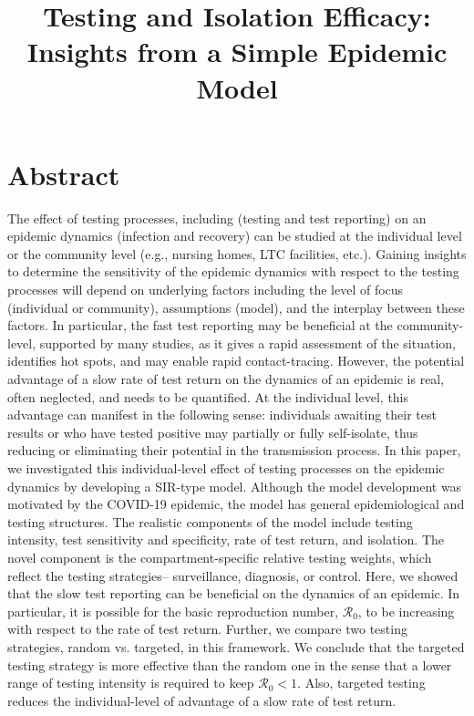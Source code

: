 \documentclass[12pt]{article}
\title{Testing and Isolation Efficacy: Insights from a Simple Epidemic Model}
\newcommand{\Rnum}{\mathcal{R}_0}
\newcommand{\covid}{COVID-19\xspace}
\theoremstyle{definition} %
\begin{document}
\maketitle

\linenumbers

\section{Abstract}

The effect of testing processes, including (testing and test reporting) on an epidemic dynamics (infection and recovery) can be studied at the individual level or the community level (e.g., nursing homes, LTC facilities, etc.). 
Gaining insights to determine the sensitivity of the epidemic dynamics with respect to the testing processes will depend on underlying factors including the level of focus (individual or community), assumptions (model), and the interplay between these factors. 
In particular, the fast test reporting may be beneficial at the community-level, supported by many studies, as it gives a rapid assessment of the situation, identifies hot spots, and may enable rapid contact-tracing. However, the potential advantage of a slow rate of test return on the dynamics of an epidemic is real, often neglected, and needs to be quantified. At the individual level, this advantage can manifest in the following sense: individuals awaiting their test results or who have tested positive may partially or fully self-isolate, thus reducing or eliminating their potential in the transmission process.
In this paper, we investigated this individual-level effect of testing processes on the epidemic dynamics by developing a SIR-type model.
Although the model development was motivated by the \covid epidemic, the model has general epidemiological and testing structures. The realistic components of the model include testing intensity, test sensitivity and specificity, rate of test return, and isolation. The novel component is the compartment-specific relative testing weights, which reflect the testing strategies-- surveillance, diagnosis, or control.
Here, we showed that the slow test reporting can be beneficial on the dynamics of an epidemic. In particular, it is possible for the basic reproduction number, $\Rnum$, to be increasing with respect to the rate of test return.  
Further, we compare two testing strategies, random vs. targeted, in this framework. We conclude that the targeted testing strategy is more effective than the random one in the sense that a lower range of testing intensity is required to keep $\Rnum <1$. Also, targeted testing reduces the individual-level of advantage of a slow rate of test return.   
\end{document}
